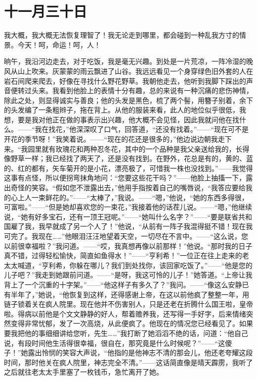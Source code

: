 \documentclass[12pt,oneside]{book}
\begin{document}
\chapter{十一月三十日}
\label{sec-4-31}
我大概，我大概无法恢复理智了！我无论走到哪里，都会碰到一种乱我方寸的情景。今天！呵，命运！呵，人！

晌午，我沿河边走去，对于吃饭，我是毫无兴趣。到处是一片荒凉，一阵冷湿的晚风从山上吹来。灰蒙蒙的雨云飘进了山谷。我远远看见一个身穿绿色旧外套的人在岩石间爬来爬去，好像在寻找什么野花野草。我朝他走去，他听到我脚下踩出的声音便转过头来。我看到他脸上的表情十分有趣，总的来说有一种沉痛的悲伤神情，除此之处，则显得诚实与善良；他的头发是黑色，梳了两个髻，用簪子别着，余下的头发编了一条粗辫子，拖在背上。从他的服装来看，此人的地位似乎很低，我想，要是我对他正在做的事表示出兴趣，他大概不会见怪，因此我就问他在找什么。——“我在找花，”他深深叹了口气，回答道，“还没有找着。”——“现在可不是开花的季节呀！”我笑着说。——“现在的花还是很多的，”他边说边朝我走下来。“我园里就有玫瑰花和两种忍冬花，其中的一个品种是我父亲送给我的，长得像野草一样；我已经找了两天了，还是没有找到。在野外，花总是有的，黄的、蓝的、红的都有，矢车菊开的是小花，漂亮极了，可惜我一株也没找到。”——我觉得这事有点怪，所以便拐弯抹角地问：“您要这些花干吗？”——他脸上抽搐一下，露出奇怪的笑容。“假如您不泄露出去，”他用手指按着自己的嘴唇说，“我答应要给我的心上人一束鲜花的。”——“太棒了，”我说。——“嗯，”他说，“她的东西多得很，可富啦。”——“但是她却喜欢您的一束花，”我接着他的话茬儿说。——“嗯，”他继续说，“她有好多宝石，还有一顶王冠呢。”——“她叫什么名字？”——“要是联省共和国雇了我，我早就成了另一个人了！”他说，“从前有一阵子我混得挺不错！现在我可完了。我现在……”他眼泪汪汪地望着天空，一切尽在不言中。——“这么说，您以前很幸福啦？”我问道。——“哎，我真想再像以前那样！”他说。“那时我的日子真不错，过得轻松愉快，简直如鱼得水！”——“亨利希！”一位正在往上走来的老太太喊道，“亨利希，你躲在哪儿？我们到处找你，该回家吃饭了。”——“他是您的儿子吧？”我走到她跟前问道。——“是呀，我这可怜的儿子！”她答道。“上帝让我背上了一个沉重的十字架。”——“他这样子有多久了？”我问。——“像这么安静已有半年了，”她说，“他恢复到这样，还得感谢上帝，在这以前他疯了整整一年，用链子锁着关在疯人院里。现在他并不伤害别人，只是还老在折腾什么国王啦，皇帝啦。得病以前他是个文文静静的好人，帮着赡养我，还写得一手好字，后来情绪突然变得非常忧郁，发了一次高烧，从此便疯了。他现在的情况您已经看见了。如果要我把他的事细细讲给您听，先生……”我打断了她滔滔不绝的话，问道：“他自己说，有段时间他生活得很幸福，很自在，那究竟是什么时候呢？”——“这傻子！”她露出怜悯的笑容大声说，“他指的是他神志不清的那会儿，他还老夸耀这段时间，那时他关在疯人院里，神志完全不清。”——这话简直像是晴天霹雳，我听了之后就往老太太手里塞了一枚钱币，急忙离开了她。
\end{document}
